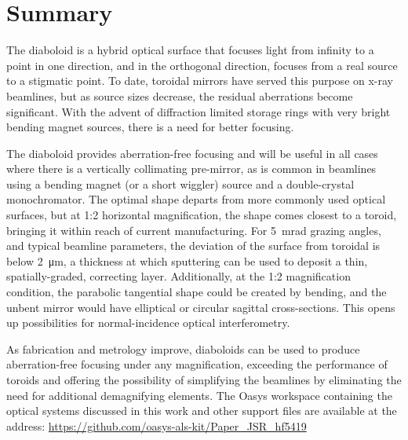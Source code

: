 \documentclass[preprint]{iucr}       %
\newcommand{\inred}[1]{{\color{red}#1}}
\begin{document}
\section{Summary}
\label{sec:summary}

The diaboloid is a hybrid optical surface that focuses light from infinity to a point in one direction, and in the orthogonal direction, focuses from a real source to a stigmatic point. To date, toroidal mirrors have served this purpose on x-ray beamlines, but as source sizes decrease, the residual aberrations become significant. With the advent of diffraction limited storage rings with very bright bending magnet sources, there is a need for better focusing. 

The diaboloid provides aberration-free focusing and will be useful in all cases where there is a vertically collimating pre-mirror, as is common \inred{in beamlines using a bending magnet (or a short wiggler) source} and a double-crystal monochromator. The optimal shape departs from more commonly used optical surfaces, but at 1:2 horizontal magnification, the shape comes closest to a toroid, bringing it within reach of current manufacturing.
For \SI{5}{\milli\radian} grazing angles, and typical beamline parameters, the deviation of the surface from toroidal is below \SI{2}{\micro\meter}, a thickness at which sputtering can be used to deposit a thin, spatially-graded, correcting layer. Additionally, at the 1:2 magnification condition, the parabolic tangential shape could be created by bending, and the unbent mirror would have elliptical or circular sagittal cross-sections. This opens up possibilities for normal-incidence optical interferometry.

As fabrication and metrology improve, diaboloids can be used to produce aberration-free focusing under any magnification, exceeding the performance of toroids and offering the possibility of \inred{simplifying the} beamlines by eliminating the need for additional demagnifying elements. \inred{The Oasys workspace containing the optical systems discussed in this work and other support files are available at the address: \url{https://github.com/oasys-als-kit/Paper_JSR_hf5419}}


\end{document}
